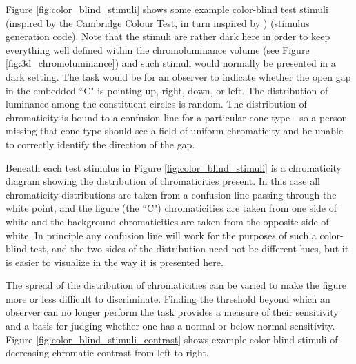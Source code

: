\documentclass{article}
\begin{document}
\begin{multicols}{2}
Figure \ref{fig:color_blind_stimuli} shows some example color-blind test stimuli (inspired by the \href{https://www.crsltd.com/tools-for-vision-science/measuring-visual-functions/cambridge-colour-test/}{Cambridge Colour Test}, in turn inspired by \cite{ishihara1918tests}) (stimulus generation \href{https://github.com/kyle-c-mcdermott/visualizing-color-space/blob/main/generation/color_blind_stimulus.py}{code}).  Note that the stimuli are rather dark here in order to keep everything well defined within the chromoluminance volume (see Figure \ref{fig:3d_chromoluminance}) and such stimuli would normally be presented in a dark setting.  The task would be for an observer to indicate whether the open gap in the embedded ``C" is pointing up, right, down, or left.  The distribution of luminance among the constituent circles is random.  The distribution of chromaticity is bound to a confusion line for a particular cone type - so a person missing that cone type should see a field of uniform chromaticity and be unable to correctly identify the direction of the gap.

Beneath each test stimulus in Figure \ref{fig:color_blind_stimuli} is a chromaticity diagram showing the distribution of chromaticities present.  In this case all chromaticity distributions are taken from a confusion line passing through the white point, and the figure (the ``C") chromaticities are taken from one side of white and the background chromaticities are taken from the opposite side of white.  In principle any confusion line will work for the purposes of such a color-blind test, and the two sides of the distribution need not be different hues, but it is easier to visualize in the way it is presented here.

The spread of the distribution of chromaticities can be varied to make the figure more or less difficult to discriminate. Finding the threshold beyond which an observer can no longer perform the task provides a measure of their sensitivity and a basis for judging whether one has a normal or below-normal sensitivity.  Figure \ref{fig:color_blind_stimuli_contrast} shows example color-blind stimuli of decreasing chromatic contrast from left-to-right.


\end{multicols}
\end{document}
